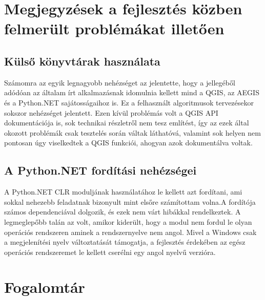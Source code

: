 \section{Megjegyzések a fejlesztés közben felmerült problémákat illetően}
\subsection{Külső könyvtárak használata}
Számomra az egyik legnagyobb nehézséget az jelentette, hogy a jellegéből adódóan az általam írt alkalmazásnak idomulnia kellett mind a QGIS, az AEGIS és a Python.NET sajátosságaihoz is. Ez a felhasznált algoritmusok tervezésekor sokszor nehézséget jelentett. Ezen kívül problémás volt a QGIS API dokumentációja is, sok technikai részletről nem tesz említést, így az ezek által okozott problémák csak tesztelés során váltak láthatóvá, valamint sok helyen nem pontosan úgy viselkedtek a QGIS funkciói, ahogyan azok dokumentálva voltak.
\subsection{A Python.NET fordítási nehézségei}
A Python.NET CLR moduljának használatához le kellett azt fordítani, ami sokkal nehezebb feladatnak bizonyult mint elsőre számítottam volna.A fordítója számos dependenciával dolgozik, és ezek nem várt hibákkal rendelkeztek. A legmeglepőbb talán az volt, amikor kiderült, hogy a modul nem fordul le olyan operációs rendszeren aminek a rendszernyelve nem angol. Mivel a Windows csak a megjelenítési nyelv változtatását támogatja, a fejlesztés érdekében az egész operációs rendszeremet le kellett cserélni egy angol nyelvű verzióra.



\section{Fogalomtár}
\label{sec:definitions}

